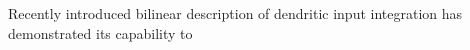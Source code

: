 Recently introduced bilinear description of dendritic input integration has demonstrated its capability to 
